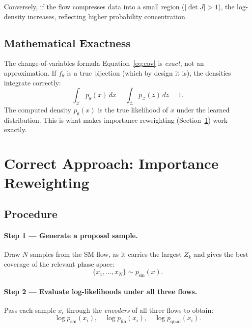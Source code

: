 \documentclass[11pt, a4paper]{article}
\begin{document}
Conversely, if the flow compresses data into a small region ($|\det J| > 1$),
the log-density increases, reflecting higher probability concentration.

\subsection{Mathematical Exactness}

The change-of-variables formula Equation~\eqref{eq:cov} is \emph{exact}, not an approximation.
If $f_\theta$ is a true bijection (which by design it is), the densities integrate correctly:
\begin{equation}
    \int_{\mathcal{X}} p_\theta(x) \, dx = \int_{\mathcal{Z}} p_\mathcal{Z}(z) \, dz = 1.
\end{equation}
The computed density $p_\theta(x)$ is the true likelihood of $x$ under the learned distribution.
This is what makes importance reweighting (Section~\ref{sec:importance}) work exactly.

\section{Correct Approach: Importance Reweighting}
\label{sec:importance}

\subsection{Procedure}

\paragraph{Step 1 — Generate a proposal sample.}
Draw $N$ samples from the SM flow, as it carries the largest $Z_k$ and gives
the best coverage of the relevant phase space:
\begin{equation}
    \{x_1, \ldots, x_N\} \sim p_\mathrm{sm}(x).
\end{equation}

\paragraph{Step 2 — Evaluate log-likelihoods under all three flows.}
Pass each sample $x_i$ through the \emph{encoders} of all three flows to obtain:
\begin{equation}
    \log p_\mathrm{sm}(x_i), \quad
    \log p_\mathrm{lin}(x_i), \quad
    \log p_\mathrm{quad}(x_i).
\end{equation}
\end{document}
